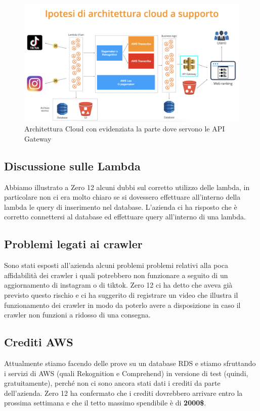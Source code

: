 \begin{figure}[!h]
\centering
\includegraphics[scale=0.35]{Sezioni/images/Architettura.png}
\caption{Architettura Cloud con evidenziata la parte dove servono le API Gateway}
\end{figure}

\subsection{Discussione sulle Lambda}

Abbiamo illustrato a Zero 12 alcuni dubbi sul corretto utilizzo delle lambda, in particolare non ci era molto chiaro se si dovessero effettuare all'interno della lambda le query di inserimento nel database. L'azienda ci ha risposto che è corretto connettersi al database ed effettuare query all'interno di una lambda.

\subsection{Problemi legati ai crawler}

Sono stati esposti all'azienda alcuni problemi problemi relativi alla poca affidabilità dei crawler i quali potrebbero non funzionare a seguito di un aggiornamento di instagram o di tiktok. Zero 12 ci ha detto che aveva già previsto questo rischio e ci ha suggerito di registrare un video che illustra il funzionamento dei crawler in modo da poterlo avere a disposizione in caso il crawler non funzioni a ridosso di una consegna.  

\subsection{Crediti AWS}

Attualmente stiamo facendo delle prove su un database RDS e stiamo sfruttando i servizi di AWS (quali Rekognition e Comprehend) in versione di test (quindi, gratuitamente), perché non ci sono ancora stati dati i crediti da parte dell'azienda. Zero 12 ha confermato che i crediti dovrebbero arrivare entro la prossima settimana e che il tetto massimo spendibile è di \textbf{2000\$}.

